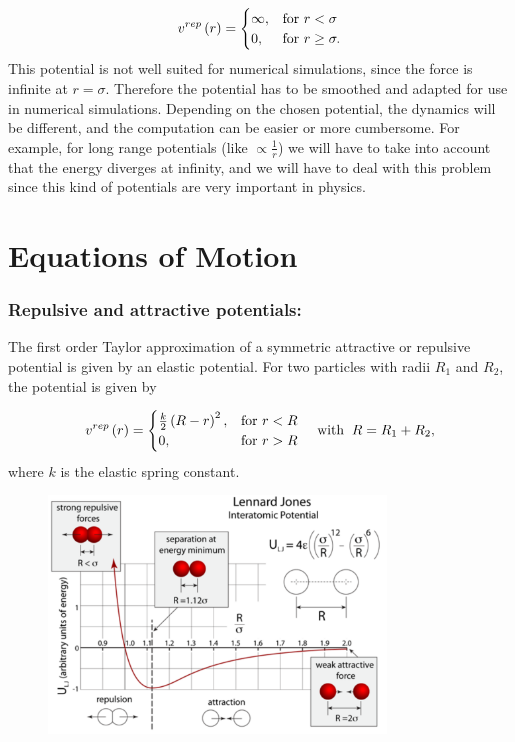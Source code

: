 $$
v^{rep}\left(r\right)=\begin{cases}
  \infty,  & \text{for } r<\sigma\\
  0, & \text{for } r\ge\sigma.
\end{cases}
$$
This potential is not well suited for numerical simulations, since the force is infinite at $r=\sigma$. Therefore the potential has to be smoothed and adapted for use in numerical simulations. Depending on the chosen potential, the dynamics will be different, and the computation can be easier or more cumbersome. For example, for long range potentials (like $\propto \frac{1}{r}$) we will have to take into account that the energy diverges at infinity, and we will have to deal with this problem since this kind of potentials are very important in physics.

\section{Equations of Motion}

\subsubsection*{Repulsive and attractive potentials:}
The first order Taylor approximation of a symmetric  attractive or repulsive potential is given by an elastic potential. For two particles with radii $R_1$ and $R_2$, the potential is given by

$$
v^{rep}\left(r\right)=\begin{cases}
  \frac{k}{2}\left(R-r\right)^2,  & \text{for } r<R\\
  0, & \text{for } r>R
\end{cases}
\hspace{0.4cm} \text{with} \hspace{0.2cm}
R= R_1 + R_2,
$$
where $k$ is the elastic spring constant.

\vspace{0.1cm}

\begin{figure}[h!]
  \centering
  \includegraphics[width=0.8\textwidth]{pics/Lennard_Jones}
  \label{fig:lennard jones}
\end{figure}

